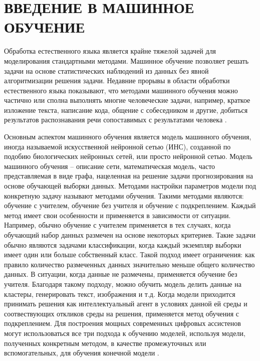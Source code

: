 \section{ВВЕДЕНИЕ В МАШИННОЕ ОБУЧЕНИЕ}
Обработка естественного языка является крайне тяжелой задачей для моделирования стандартными методами. Машинное обучение позволяет решать задачи на основе статистических наблюдений из данных без явной алгоритмизации решения задачи. Недавние прорывы в области обработки естественного языка показывают, что методами машинного обучения можно частично или сполна выполнять многие человеческие задачи, например, краткое изложение текста, написание кода, общение с собеседником и другие, добиться результатов распознавания речи сопоставимых с результатами человека \cite{human-wer,whisper}.

Основным аспектом машинного обучения является модель машинного обучения, иногда называемой искусственной нейронной сетью (ИНС), созданной по подобию биологических нейронных сетей, или просто нейронной сетью. Модель машинного обучения -- описание сети, математическая модель, часто представляемая в виде графа, нацеленная на решение задачи прогнозирования на основе обучающей выборки данных. Методами настройки параметров модели под конкретную задачу называют методами обучения. Такими методами являются: обучение с учителем, обучение без учителя и обучение с подкреплением. Каждый метод имеет свои особенности и применяется в зависимости от ситуации. Например, обычно обучение с учителем применяется в тех случаях, когда обучающий набор данных размечен на основе некоторых критериев. Такие задачи обычно являются задачами классификации, когда каждый экземпляр выборки имеет один или больше собственный класс. Такой подход имеет ограничения: как правило количество размеченных данных значительно меньше общего количество данных. В ситуации, когда данные не размечены, применяется обучение без учителя. Благодаря такому подходу, можно обучить модель делить данные на кластеры, генерировать текст, изображения и т.д. Когда модели приходится принимать решения как интеллектуальный агент в условиях данной ей среды и соотвествующих откликов среды на решения, применяется метод обучения с подкреплением. Для построения мощных современных цифровых ассистенов могут использоваться все три подхода к обучению моделей, используя модели, полученных конкретным методом, в качестве промежуточных или вспомогательных, для обучения конечной модели \cite{state-of-gpt}.

